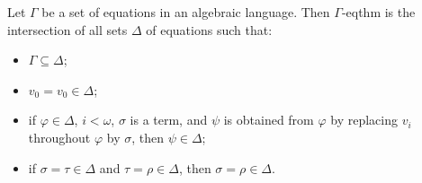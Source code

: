 Let $\Gamma$ be a set of equations in an algebraic language. Then $\Gamma$-eqthm is the intersection of all sets $\Delta$ of equations such that:
\begin{itemize}
\item[(i)] $\Gamma \subseteq \Delta$;
\item[(ii)] $v_0 = v_0 \in \Delta$;
\item[(iii)] if $\varphi \in \Delta$, $i < \omega$, $\sigma$ is a term, and $\psi$ is obtained from $\varphi$ by replacing $v_i$ throughout $\varphi$ by $\sigma$, then $\psi \in \Delta$;
\item[(iv)] if $\sigma = \tau \in \Delta$ and $\tau = \rho \in \Delta$, then $\sigma = \rho \in \Delta$.
\end{itemize}
